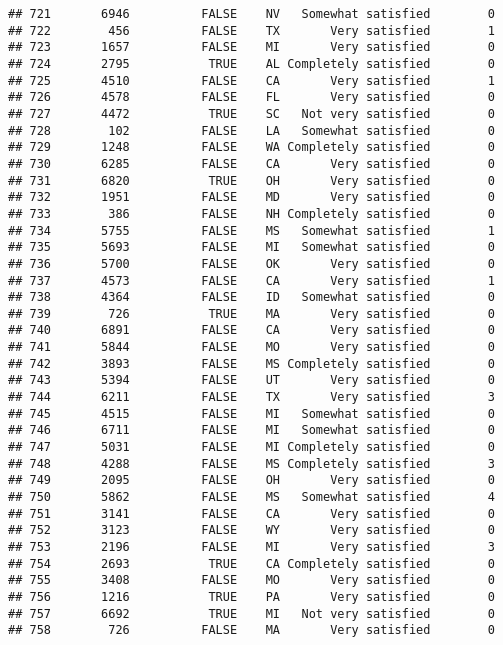 \documentclass[]{book}
\theoremstyle{definition}
\theoremstyle{definition}
\theoremstyle{remark}
\begin{document}
\begin{verbatim}
## 721       6946          FALSE    NV   Somewhat satisfied        0
## 722        456          FALSE    TX       Very satisfied        1
## 723       1657          FALSE    MI       Very satisfied        0
## 724       2795           TRUE    AL Completely satisfied        0
## 725       4510          FALSE    CA       Very satisfied        1
## 726       4578          FALSE    FL       Very satisfied        0
## 727       4472           TRUE    SC   Not very satisfied        0
## 728        102          FALSE    LA   Somewhat satisfied        0
## 729       1248          FALSE    WA Completely satisfied        0
## 730       6285          FALSE    CA       Very satisfied        0
## 731       6820           TRUE    OH       Very satisfied        0
## 732       1951          FALSE    MD       Very satisfied        0
## 733        386          FALSE    NH Completely satisfied        0
## 734       5755          FALSE    MS   Somewhat satisfied        1
## 735       5693          FALSE    MI   Somewhat satisfied        0
## 736       5700          FALSE    OK       Very satisfied        0
## 737       4573          FALSE    CA       Very satisfied        1
## 738       4364          FALSE    ID   Somewhat satisfied        0
## 739        726           TRUE    MA       Very satisfied        0
## 740       6891          FALSE    CA       Very satisfied        0
## 741       5844          FALSE    MO       Very satisfied        0
## 742       3893          FALSE    MS Completely satisfied        0
## 743       5394          FALSE    UT       Very satisfied        0
## 744       6211          FALSE    TX       Very satisfied        3
## 745       4515          FALSE    MI   Somewhat satisfied        0
## 746       6711          FALSE    MI   Somewhat satisfied        0
## 747       5031          FALSE    MI Completely satisfied        0
## 748       4288          FALSE    MS Completely satisfied        3
## 749       2095          FALSE    OH       Very satisfied        0
## 750       5862          FALSE    MS   Somewhat satisfied        4
## 751       3141          FALSE    CA       Very satisfied        0
## 752       3123          FALSE    WY       Very satisfied        0
## 753       2196          FALSE    MI       Very satisfied        3
## 754       2693           TRUE    CA Completely satisfied        0
## 755       3408          FALSE    MO       Very satisfied        0
## 756       1216           TRUE    PA       Very satisfied        0
## 757       6692           TRUE    MI   Not very satisfied        0
## 758        726          FALSE    MA       Very satisfied        0

\end{verbatim}
\end{document}
